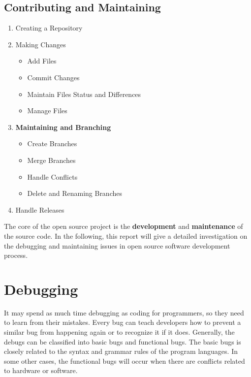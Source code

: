 \documentclass[draftclsnofoot,journal,onecolumn,12pt]{IEEEtran}
\begin{document}
\subsection{Contributing and Maintaining}

\begin{enumerate}
  \item Creating a Repository
  \item Making Changes
  \begin{itemize}
    \item Add Files
    \item Commit Changes
    \item Maintain Files Status and Differences
    \item Manage Files
  \end{itemize}
  \item \textbf{Maintaining and Branching}
  \begin{itemize}
    \item Create Branches
    \item Merge Branches
    \item Handle Conflicts
    \item Delete and Renaming Branches
\end{itemize}
  \item Handle Releases
\end{enumerate}

The core of the open source project is the \textbf{development} and \textbf{maintenance} of the source code. In the following, this report will give a detailed investigation on the debugging and maintaining issues in open source software development process.

\section{Debugging}


It may spend as much time debugging as coding for programmers, so they need to learn from their mistakes. Every bug can teach developers how to prevent a similar bug from happening again or to recognize it if it does. Generally, the debugs can be classified into basic bugs and functional bugs. The basic bugs is closely related to the syntax and grammar rules of the program languages. In some other cases, the functional bugs will occur when there are conflicts related to hardware or software.
\end{document}
